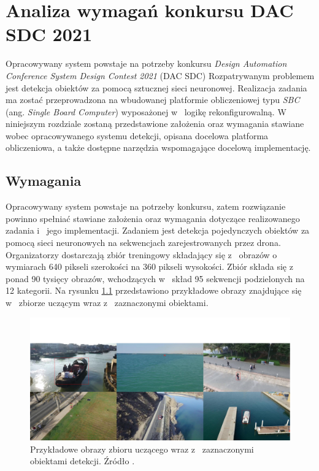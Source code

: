 \chapter{Analiza wymagań konkursu DAC SDC 2021}
\label{cha:Analiza probemu}

Opracowywany system powstaje na potrzeby konkursu \emph{Design Automation Conference System Design Contest 2021} (DAC SDC)
Rozpatrywanym problemem jest detekcja obiektów za pomocą sztucznej sieci neuronowej.
Realizacja zadania ma zostać przeprowadzona na wbudowanej platformie obliczeniowej typu \emph{SBC} (ang. \emph{Single Board Computer}) wyposażonej w~ logikę rekonfigurowalną.
W niniejszym rozdziale zostaną przedstawione założenia oraz wymagania stawiane wobec opracowywanego systemu detekcji, opisana docelowa platforma obliczeniowa, 
a także dostępne narzędzia wspomagające docelową implementację.


\section{Wymagania}
Opracowywany system powstaje na potrzeby konkursu, zatem rozwiązanie powinno spełniać stawiane założenia oraz wymagania dotyczące realizowanego zadania i~ jego implementacji.
Zadaniem jest detekcja pojedynczych obiektów za pomocą sieci neuronowych na sekwencjach zarejestrowanych przez drona.
Organizatorzy dostarczają zbiór treningowy składający się z~ obrazów o~ wymiarach 640 pikseli szerokości na 360 pikseli wysokości. Zbiór składa się z~ ponad 90 tysięcy obrazów, wchodzących w~ skład 95 sekwencji podzielonych na 12 kategorii. Na rysunku \ref{fig:sample_images} przedstawiono przykładowe obrazy znajdujące się w~ zbiorze uczącym wraz z~ zaznaczonymi obiektami.
\begin{figure}
    \centering
    \includegraphics[width=\linewidth]{images/sample_images.png}
    \caption{Przykładowe obrazy zbioru uczącego wraz z~ zaznaczonymi obiektami detekcji. Źródło \cite{dac_sdc_2021}.}
    \label{fig:sample_images}
\end{figure}

